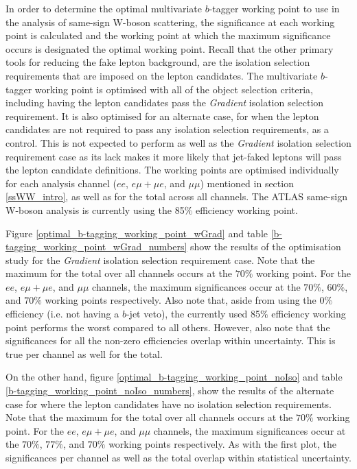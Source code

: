 In order to determine the optimal multivariate $b$-tagger working point to use in the analysis of same-sign W-boson scattering, the significance at each working point is calculated and the working point at which the maximum significance occurs is designated the optimal working point. Recall that the other primary tools for reducing the fake lepton background, are the isolation selection requirements that are imposed on the lepton candidates. The multivariate $b$-tagger working point is optimised with all of the object selection criteria, including having the lepton candidates pass the \textit{Gradient} isolation selection requirement. It is also optimised for an alternate case, for when the lepton candidates are not required to pass any isolation selection requirements, as a control. This is not expected to perform as well as the \textit{Gradient} isolation selection requirement case as its lack makes it more likely that jet-faked leptons will pass the lepton candidate definitions. The working points are optimised individually for each analysis channel ($ee$, $e\mu +\mu e$, and $\mu\mu$) mentioned in section \ref{ssWW_intro}, as well as for the total across all channels. The ATLAS same-sign W-boson analysis is currently using the 85$\%$ efficiency working point.

Figure \ref{optimal_b-tagging_working_point_wGrad} and table \ref{b-tagging_working_point_wGrad_numbers} show the results of the optimisation study for the \textit{Gradient} isolation selection requirement case. Note that the maximum for the total over all channels occurs at the $70\%$ working point. For the $ee$, $e \mu + \mu e$, and $\mu\mu$ channels, the maximum significances occur at the $70\%$, $60\%$, and $70\%$ working points respectively. Also note that, aside from using the 0$\%$ efficiency (i.e. not having a $b$-jet veto), the currently used 85$\%$ efficiency working point performs the worst compared to all others. However, also note that the significances for all the non-zero efficiencies overlap within uncertainty. This is true per channel as well for the total.

On the other hand, figure \ref{optimal_b-tagging_working_point_noIso} and table \ref{b-tagging_working_point_noIso_numbers}, show the results of the alternate case for where the lepton candidates have no isolation selection requirements. Note that the maximum for the total over all channels occurs at the $70\%$ working point. For the $ee$, $e \mu + \mu e$, and $\mu\mu$ channels, the maximum significances occur at the $70\%$, $77\%$, and $70\%$ working points respectively. As with the first plot, the significances per channel as well as the total overlap within statistical uncertainty.

